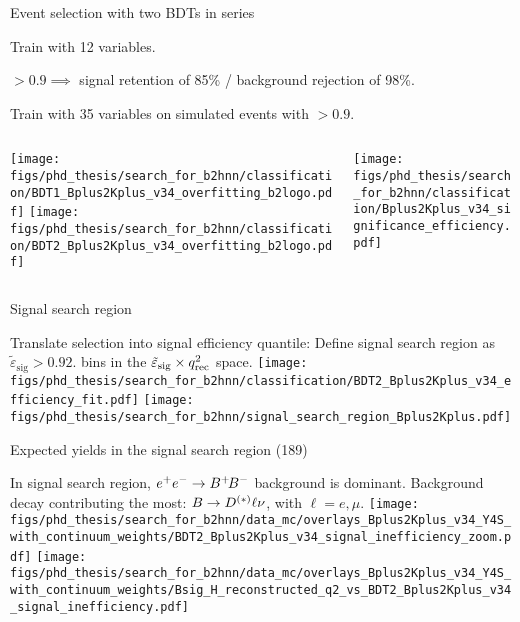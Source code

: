 \begin{frame}{Event selection with two BDTs in series}
\bi
\item Train \bdto with 12 variables.
\bi
\item {\footnotesize \bdto$>0.9\implies$ signal retention of 85\% / background rejection of 98\%.}
\ei
\item Train \bdtt with 35 variables on simulated events with \bdto$>0.9$.
\ei
\vspace{0.25cm}
\begin{columns}
\begin{column}{0.5\linewidth}
\centering
\texttt{[image: figs/phd\_thesis/search\_for\_b2hnn/classification/BDT1\_Bplus2Kplus\_v34\_overfitting\_b2logo.pdf]}
\texttt{[image: figs/phd\_thesis/search\_for\_b2hnn/classification/BDT2\_Bplus2Kplus\_v34\_overfitting\_b2logo.pdf]}
\end{column}
\begin{column}{0.5\linewidth}
\centering
\texttt{[image: figs/phd\_thesis/search\_for\_b2hnn/classification/Bplus2Kplus\_v34\_significance\_efficiency.pdf]}
\end{column}
\end{columns}
\end{frame}
\begin{frame}{Signal search region}
\bi
\item Translate \bdtt selection into signal efficiency quantile:
\bi
{}
\ei
\itemii Define signal search region as $\tilde{\varepsilon}_{\mathrm{sig}}>0.92$.
\bi
{} bins in the $\tilde{\varepsilon}_{\mathrm{sig}}\times q_{\mathrm{rec}}^2$ space.
\ei
\ei
\vspace{0.25cm}
\centering
\texttt{[image: figs/phd\_thesis/search\_for\_b2hnn/classification/BDT2\_Bplus2Kplus\_v34\_efficiency\_fit.pdf]}
\texttt{[image: figs/phd\_thesis/search\_for\_b2hnn/signal\_search\_region\_Bplus2Kplus.pdf]}
\end{frame}
\begin{frame}{Expected yields in the signal search region (189\invfb)}
\bi
\item In signal search region, $e^+e^-\rightarrow B^+ {\kern -0.16em B^-}$ background is dominant.
\bi
\itemii Background decay contributing the most: $B\rightarrow D^{(*)}\ell\nu$, with $\ell=e,\mu$.
\ei
\ei
\vspace{0.5cm}
\centering
\texttt{[image: figs/phd\_thesis/search\_for\_b2hnn/data\_mc/overlays\_Bplus2Kplus\_v34\_Y4S\_with\_continuum\_weights/BDT2\_Bplus2Kplus\_v34\_signal\_inefficiency\_zoom.pdf]}
\texttt{[image: figs/phd\_thesis/search\_for\_b2hnn/data\_mc/overlays\_Bplus2Kplus\_v34\_Y4S\_with\_continuum\_weights/Bsig\_H\_reconstructed\_q2\_vs\_BDT2\_Bplus2Kplus\_v34\_signal\_inefficiency.pdf]}
\end{frame}
